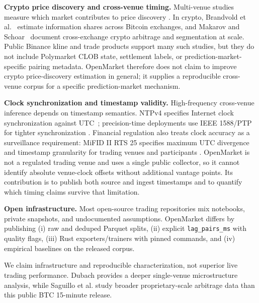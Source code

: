 \textbf{Crypto price discovery and cross-venue timing.}
Multi-venue studies measure which market contributes to price discovery
\cite{hasbrouck1995one}. In crypto, Brandvold et
al.~\cite{brandvold2015bitcoin} estimate information shares across Bitcoin
exchanges, and Makarov and Schoar~\cite{makarov2020trading} document
cross-exchange crypto arbitrage and segmentation at scale. Public Binance kline
and trade products support many such studies, but they do not include
Polymarket CLOB state, settlement labels, or prediction-market-specific pairing
metadata. OpenMarket therefore does not claim to improve crypto price-discovery
estimation in general; it supplies a reproducible cross-venue corpus for a
specific prediction-market mechanism.

\textbf{Clock synchronization and timestamp validity.}
High-frequency cross-venue inference depends on timestamp semantics. NTPv4
specifies Internet clock synchronization against UTC~\cite{mills2010ntp};
precision-time deployments use IEEE 1588/PTP for tighter synchronization
\cite{ieee1588}. Financial regulation also treats clock accuracy as a
surveillance requirement: MiFID II RTS 25 specifies maximum UTC divergence and
timestamp granularity for trading venues and participants
\cite{mifid2016rts25}. OpenMarket is not a regulated trading venue and uses a
single public collector, so it cannot identify absolute venue-clock offsets
without additional vantage points. Its contribution is to publish both
source and ingest timestamps and to quantify which timing claims survive that
limitation.

\textbf{Open infrastructure.}
Most open-source trading repositories mix notebooks, private snapshots, and
undocumented assumptions. OpenMarket differs by publishing (i) raw and deduped
Parquet splits, (ii) explicit \texttt{lag\_pairs\_ms} with quality flags, (iii)
Rust exporters/trainers with pinned commands, and (iv) empirical baselines on the
released corpus.

We claim infrastructure and reproducible characterization, not superior live
trading performance. Dubach provides a deeper single-venue microstructure
analysis, while Saguillo et al. study broader proprietary-scale arbitrage data
than this public BTC 15-minute release.
